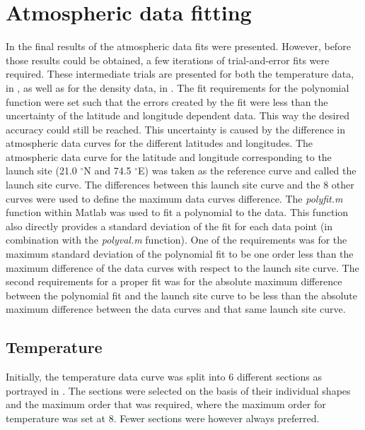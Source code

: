 \chapter{Atmospheric data fitting}
\label{app:appendixB-fittingProcessAndResults}
In  the final results of the atmospheric data fits were presented. However, before those results could be obtained, a few iterations of trial-and-error fits were required. These intermediate trials are presented for both the temperature data, in , as well as for the density data, in . The fit requirements for the polynomial function were set such that the errors created by the fit were less than the uncertainty of the latitude and longitude dependent data. This way the desired accuracy could still be reached. This uncertainty is caused by the difference in atmospheric data curves for the different latitudes and longitudes. The atmospheric data curve for the latitude and longitude corresponding to the launch site (21.0 $^\circ$N and 74.5 $^\circ$E) was taken as the reference curve and called the launch site curve. The differences between this launch site curve and the 8 other curves were used to define the maximum data curves difference. The \textit{polyfit.m} function within Matlab was used to fit a polynomial to the data. This function also directly provides a standard deviation of the fit for each data point (in combination with the \textit{polyval.m} function). One of the requirements was for the maximum standard deviation of the polynomial fit to be one order less than the maximum difference of the data curves with respect to the launch site curve. The second requirements for a proper fit was for the absolute maximum difference between the polynomial fit and the launch site curve to be less than the absolute maximum difference between the data curves and that same launch site curve. 


\section{Temperature}
\label{appsec:tempFit}
Initially, the temperature data curve was split into 6 different sections as portrayed in . The sections were selected on the basis of their individual shapes and the maximum order that was required, where the maximum order for temperature was set at 8. Fewer sections were however always preferred. 

